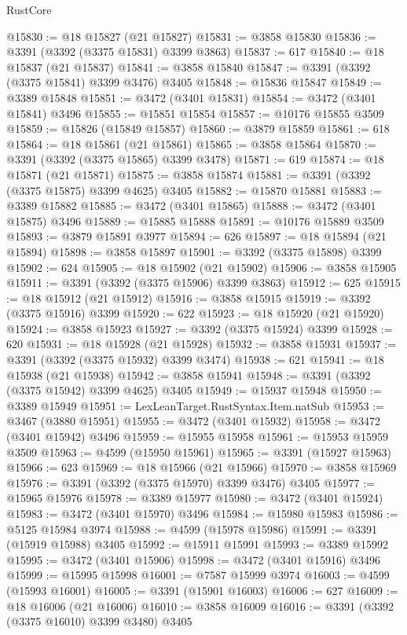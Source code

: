 \begin{lexlean}{RustCore}
\begin{coremodule}
@15830 := @18 @15827 (@21 @15827)
@15831 := @3858 @15830
@15836 := @3391 (@3392 (@3375 @15831) @3399 @3863)
@15837 := 617
@15840 := @18 @15837 (@21 @15837)
@15841 := @3858 @15840
@15847 := @3391 (@3392 (@3375 @15841) @3399 @3476) @3405
@15848 := @15836 @15847
@15849 := @3389 @15848
@15851 := @3472 (@3401 @15831)
@15854 := @3472 (@3401 @15841) @3496
@15855 := @15851 @15854
@15857 := @10176 @15855 @3509
@15859 := @15826 (@15849 @15857)
@15860 := @3879 @15859
@15861 := 618
@15864 := @18 @15861 (@21 @15861)
@15865 := @3858 @15864
@15870 := @3391 (@3392 (@3375 @15865) @3399 @3478)
@15871 := 619
@15874 := @18 @15871 (@21 @15871)
@15875 := @3858 @15874
@15881 := @3391 (@3392 (@3375 @15875) @3399 @4625) @3405
@15882 := @15870 @15881
@15883 := @3389 @15882
@15885 := @3472 (@3401 @15865)
@15888 := @3472 (@3401 @15875) @3496
@15889 := @15885 @15888
@15891 := @10176 @15889 @3509
@15893 := @3879 @15891 @3977
@15894 := 626
@15897 := @18 @15894 (@21 @15894)
@15898 := @3858 @15897
@15901 := @3392 (@3375 @15898) @3399
@15902 := 624
@15905 := @18 @15902 (@21 @15902)
@15906 := @3858 @15905
@15911 := @3391 (@3392 (@3375 @15906) @3399 @3863)
@15912 := 625
@15915 := @18 @15912 (@21 @15912)
@15916 := @3858 @15915
@15919 := @3392 (@3375 @15916) @3399
@15920 := 622
@15923 := @18 @15920 (@21 @15920)
@15924 := @3858 @15923
@15927 := @3392 (@3375 @15924) @3399
@15928 := 620
@15931 := @18 @15928 (@21 @15928)
@15932 := @3858 @15931
@15937 := @3391 (@3392 (@3375 @15932) @3399 @3474)
@15938 := 621
@15941 := @18 @15938 (@21 @15938)
@15942 := @3858 @15941
@15948 := @3391 (@3392 (@3375 @15942) @3399 @4625) @3405
@15949 := @15937 @15948
@15950 := @3389 @15949
@15951 := LexLeanTarget.RustSyntax.Item.natSub
@15953 := @3467 (@3880 @15951)
@15955 := @3472 (@3401 @15932)
@15958 := @3472 (@3401 @15942) @3496
@15959 := @15955 @15958
@15961 := @15953 @15959 @3509
@15963 := @4599 (@15950 @15961)
@15965 := @3391 (@15927 @15963)
@15966 := 623
@15969 := @18 @15966 (@21 @15966)
@15970 := @3858 @15969
@15976 := @3391 (@3392 (@3375 @15970) @3399 @3476) @3405
@15977 := @15965 @15976
@15978 := @3389 @15977
@15980 := @3472 (@3401 @15924)
@15983 := @3472 (@3401 @15970) @3496
@15984 := @15980 @15983
@15986 := @5125 @15984 @3974
@15988 := @4599 (@15978 @15986)
@15991 := @3391 (@15919 @15988) @3405
@15992 := @15911 @15991
@15993 := @3389 @15992
@15995 := @3472 (@3401 @15906)
@15998 := @3472 (@3401 @15916) @3496
@15999 := @15995 @15998
@16001 := @7587 @15999 @3974
@16003 := @4599 (@15993 @16001)
@16005 := @3391 (@15901 @16003)
@16006 := 627
@16009 := @18 @16006 (@21 @16006)
@16010 := @3858 @16009
@16016 := @3391 (@3392 (@3375 @16010) @3399 @3480) @3405

\end{coremodule}
\end{lexlean}
